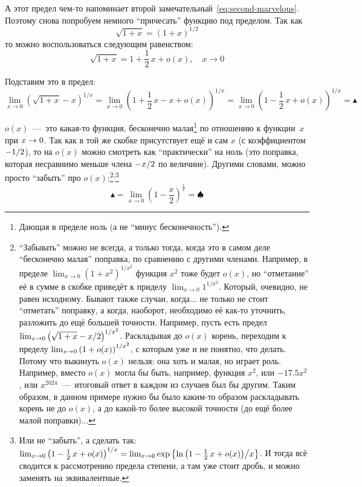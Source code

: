 \documentclass[a4paper,12pt]{article}
\begin{document}
  \begin{solution}
    А этот предел чем-то напоминает второй замечательный~\eqref{eq:second-marvelous}.
    Поэтому снова попробуем немного ``причесать'' функцию под пределом.
    Так как
    \[
      \sqrt{1 + x} = (1 + x)^{1/2}
    \]
    то можно воспользоваться следующим равенством:
    \[
      \sqrt{1 + x} = 1 + \frac{1}{2}\, x + o(x),\quad x \to 0
    \]

    Подставим это в предел:
    \[
      \lim_{x \to 0} \left(\sqrt{1 + x} - x\right)^{1 / x}
        = \lim_{x \to 0} \left(1 + \frac{1}{2}\, x - x + o(x)\right)^{1 / x}
        = \lim_{x \to 0} \left(1 - \frac{1}{2}\, x + o(x)\right)^{1 / x}
        = \blacktriangle
    \]

    $o(x)$~---~это какая-то функция, бесконечно малая\footnote{
      Дающая в пределе ноль (а не ``минус бесконечность'').
    } по отношению к функции~$x$ при $x \hm\to 0$.
    Так как в той же скобке присутствует ещё и сам $x$ (с коэффициентом $-1\hm/2$), то на $o(x)$ можно смотреть как ``практически'' на ноль (это поправка, которая несравнимо меньше члена $-x\hm/2$ по величине).
    Другими словами, можно просто ``забыть'' про $o(x)$:\footnote{
      ``Забывать'' можно не всегда, а только тогда, когда это в самом деле ``бесконечно малая'' поправка, по сравнению с другими членами. 
      Например, в пределе $\lim_{x \to 0} \left(1 + x^2\right)^{1/x^2}$ функция $x^2$ тоже будет $o(x)$, но ``отметание'' её в сумме в скобке приведёт к приделу $\lim_{x \to 0} 1^{1/x^2}$.
      Который, очевидно, не равен исходному.
      Бывают также случаи, когда... не только не стоит ``отметать'' поправку, а когда, наоборот, необходимо её как-то уточнить, разложить до ещё большей точности.
      Например, пусть есть предел $\lim_{x \to 0} \left(\sqrt{1 + x} \hm- x \hm/ 2\right)^{1/x^2}$.
      Раскладывая до $o(x)$ корень, переходим к пределу $\lim_{x \to 0} \left(1 \hm+ o(x)\right)^{1/x^2}$, с которым уже и не понятно, что делать.
      Потому что выкинуть $o(x)$ нельзя: она хоть и малая, но играет роль.
      Например, вместо $o(x)$ могла бы быть, например, функция $x^2$, или $-17{.}5 x^2$, или $x^{2024}$~---~итоговый ответ в каждом из случаев был бы другим.
      Таким образом, в данном примере нужно бы было каким-то образом раскладывать корень не до $o(x)$, а до какой-то более высокой точности (до ещё более малой поправки)...
    }\textsuperscript{,}\footnote{
      Или не ``забыть'', а сделать так:
      $\lim_{x \to 0} \left(1 \hm- \frac{1}{2}\, x \hm+ o(x)\right)^{1 \hm/ x} \hm= \lim_{x \to 0} \exp\left\{ \ln{\left(1 \hm- \frac{1}{2}\, x \hm+ o(x)\right)} \hm{\big/} x \right\}$.
      И тогда всё сводится к рассмотрению предела степени, а там уже стоит дробь, и можно заменять на эквивалентные.
    }
    \[
      \blacktriangle = \lim_{x \to 0} \left(1 - \frac{x}{2}\right)^{\frac{1}{x}} = \spadesuit
    \]


\end{solution}
\end{document}

